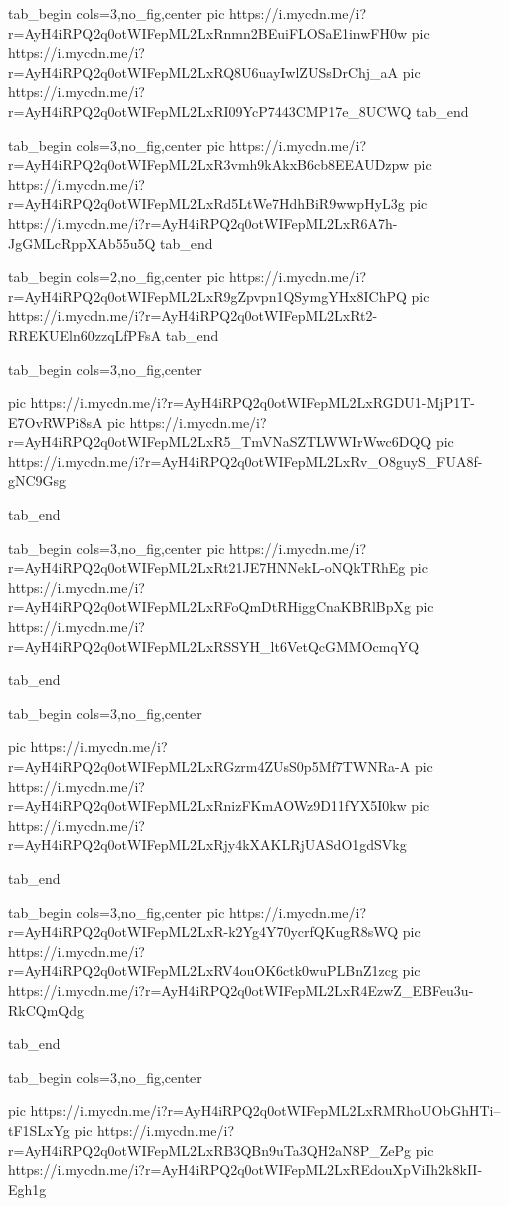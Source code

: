 \ifcmt
  tab_begin cols=3,no_fig,center
     pic https://i.mycdn.me/i?r=AyH4iRPQ2q0otWIFepML2LxRnmn2BEuiFLOSaE1inwFH0w
		 pic https://i.mycdn.me/i?r=AyH4iRPQ2q0otWIFepML2LxRQ8U6uayIwlZUSsDrChj_aA
		 pic https://i.mycdn.me/i?r=AyH4iRPQ2q0otWIFepML2LxRI09YcP7443CMP17e_8UCWQ
  tab_end
\fi


\ifcmt
  tab_begin cols=3,no_fig,center
     pic https://i.mycdn.me/i?r=AyH4iRPQ2q0otWIFepML2LxR3vmh9kAkxB6cb8EEAUDzpw
		 pic https://i.mycdn.me/i?r=AyH4iRPQ2q0otWIFepML2LxRd5LtWe7HdhBiR9wwpHyL3g
		 pic https://i.mycdn.me/i?r=AyH4iRPQ2q0otWIFepML2LxR6A7h-JgGMLcRppXAb55u5Q
  tab_end
\fi

\ifcmt
  tab_begin cols=2,no_fig,center
		pic https://i.mycdn.me/i?r=AyH4iRPQ2q0otWIFepML2LxR9gZpvpn1QSymgYHx8IChPQ
		pic https://i.mycdn.me/i?r=AyH4iRPQ2q0otWIFepML2LxRt2-RREKUEln60zzqLfPFsA
  tab_end
\fi



\ifcmt
  tab_begin cols=3,no_fig,center

     pic https://i.mycdn.me/i?r=AyH4iRPQ2q0otWIFepML2LxRGDU1-MjP1T-E7OvRWPi8sA
		 pic https://i.mycdn.me/i?r=AyH4iRPQ2q0otWIFepML2LxR5_TmVNaSZTLWWIrWwc6DQQ
		 pic https://i.mycdn.me/i?r=AyH4iRPQ2q0otWIFepML2LxRv_O8guyS_FUA8f-gNC9Gsg

  tab_end
\fi

\ifcmt
  tab_begin cols=3,no_fig,center
		pic https://i.mycdn.me/i?r=AyH4iRPQ2q0otWIFepML2LxRt21JE7HNNekL-oNQkTRhEg
		pic https://i.mycdn.me/i?r=AyH4iRPQ2q0otWIFepML2LxRFoQmDtRHiggCnaKBRlBpXg
		pic https://i.mycdn.me/i?r=AyH4iRPQ2q0otWIFepML2LxRSSYH_lt6VetQcGMMOcmqYQ

  tab_end
\fi


\ifcmt
  tab_begin cols=3,no_fig,center

     pic https://i.mycdn.me/i?r=AyH4iRPQ2q0otWIFepML2LxRGzrm4ZUsS0p5Mf7TWNRa-A
		 pic https://i.mycdn.me/i?r=AyH4iRPQ2q0otWIFepML2LxRnizFKmAOWz9D11fYX5I0kw
		 pic https://i.mycdn.me/i?r=AyH4iRPQ2q0otWIFepML2LxRjy4kXAKLRjUASdO1gdSVkg

  tab_end
\fi

\ifcmt
  tab_begin cols=3,no_fig,center
		pic https://i.mycdn.me/i?r=AyH4iRPQ2q0otWIFepML2LxR-k2Yg4Y70ycrfQKugR8sWQ
		pic https://i.mycdn.me/i?r=AyH4iRPQ2q0otWIFepML2LxRV4ouOK6ctk0wuPLBnZ1zcg
		pic https://i.mycdn.me/i?r=AyH4iRPQ2q0otWIFepML2LxR4EzwZ_EBFeu3u-RkCQmQdg

  tab_end
\fi


\ifcmt
  tab_begin cols=3,no_fig,center

     pic https://i.mycdn.me/i?r=AyH4iRPQ2q0otWIFepML2LxRMRhoUObGhHTi--tF1SLxYg
		 pic https://i.mycdn.me/i?r=AyH4iRPQ2q0otWIFepML2LxRB3QBn9uTa3QH2aN8P_ZePg
		 pic https://i.mycdn.me/i?r=AyH4iRPQ2q0otWIFepML2LxREdouXpViIh2k8kII-Egh1g

